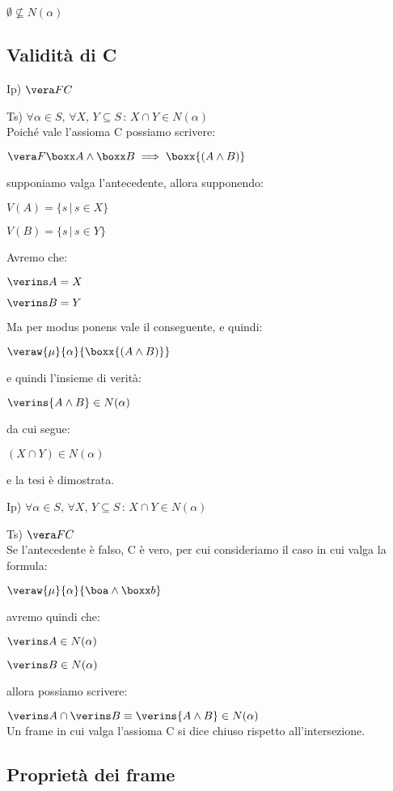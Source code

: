 $\emptyset\nsubseteq N(\alpha)$


\subsection{Validità di C}

Ip) $\vera FC$ 

Ts) $\forall\alpha\in S,\,\forall X,\, Y\subseteq S\,:\, X\cap Y\in N(\alpha)$\\


Poiché vale l'assioma C possiamo scrivere:

$\vera F{\boxx A\wedge\boxx B}\implies\boxx{(A\wedge B)}$

supponiamo valga l'antecedente, allora supponendo:

$V(A)=\{s\,|\, s\in X\}$

$V(B)=\{s\,|\, s\in Y\}$

Avremo che:

$\verins A=X$

$\verins B=Y$

Ma per modus ponens vale il conseguente, e quindi:

$\veraw{\mu}{\alpha}{\boxx{(A\wedge B)}}$

e quindi l'insieme di verità:

$\verins{A\wedge B}\in N(\alpha)$

da cui segue:

$(X\cap Y)\in N(\alpha)$

e la tesi è dimostrata.

Ip) $\forall\alpha\in S,\,\forall X,\, Y\subseteq S\,:\, X\cap Y\in N(\alpha)$

Ts) $\vera FC$ \\


Se l'antecedente è falso, C è vero, per cui consideriamo il caso in
cui valga la formula:

$\veraw{\mu}{\alpha}{\boa\wedge\boxx b}$

avremo quindi che:

$\verins A\in N(\alpha)$

$\verins B\in N(\alpha)$

allora possiamo scrivere:

$\verins A\cap\verins B\equiv\verins{A\wedge B}\in N(\alpha)$\\


Un frame in cui valga l'assioma C si dice chiuso rispetto all'intersezione.


\subsection{Proprietà dei frame}

